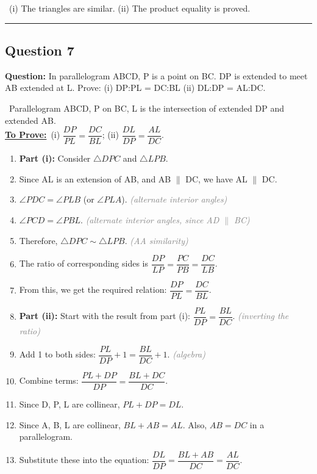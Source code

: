 \documentclass{article}
\newenvironment{steps}{%
  \begin{enumerate}[label=\textcolor{primary}{Step~\arabic*:}, leftmargin=*]
}{\end{enumerate}}
\newcommand{\sul}[1]{\uline{#1}}
\newcommand{\dul}[1]{\uuline{#1}}
\newcommand{\solutionheading}{{\raggedright\dul{\textbf{Solution}}\par}}
\newcommand{\given}[1]{\noindent\textbf{\textcolor{secondary}{\dul{Given:}}}~#1\\}
\newcommand{\toprove}[1]{\noindent\textbf{\textcolor{primary}{\sul{To Prove:}}}~#1\\}
\newcommand{\reason}[1]{\hfill\textit{\textcolor{gray}{(#1)}}}
\newcommand{\solutionrule}{\par\noindent\color{accent}\rule{\linewidth}{0.6pt}\par\smallskip}
\newcommand{\finalanswer}[1]{\noindent\textbf{\textcolor{accent}{\dul{Answer:}}}~#1\solutionrule}
\begin{document}
\finalanswer{(i) The triangles are similar. (ii) The product equality is proved.}

\subsection*{Question 7}
\textbf{Question:} In parallelogram ABCD, P is a point on BC. DP is extended to meet AB extended at L. Prove: (i) DP:PL = DC:BL (ii) DL:DP = AL:DC.

\solutionheading
\given{Parallelogram ABCD, P on BC, L is the intersection of extended DP and extended AB.}
\toprove{(i) $\dfrac{DP}{PL} = \dfrac{DC}{BL}$; (ii) $\dfrac{DL}{DP} = \dfrac{AL}{DC}$.}

\begin{center}
\end{center}

\begin{steps}
  \item \textbf{Part (i):} Consider $\triangle DPC$ and $\triangle LPB$.
  \item Since AL is an extension of AB, and AB $\parallel$ DC, we have AL $\parallel$ DC.
  \item $\angle PDC = \angle PLB$ (or $\angle PL A$). \reason{alternate interior angles}
  \item $\angle PCD = \angle PBL$. \reason{alternate interior angles, since AD $\parallel$ BC}
  \item Therefore, $\triangle DPC \sim \triangle LPB$. \reason{AA similarity}
  \item The ratio of corresponding sides is $\dfrac{DP}{LP} = \dfrac{PC}{PB} = \dfrac{DC}{LB}$.
  \item From this, we get the required relation: $\dfrac{DP}{PL} = \dfrac{DC}{BL}$.
  \item \textbf{Part (ii):} Start with the result from part (i): $\dfrac{PL}{DP} = \dfrac{BL}{DC}$. \reason{inverting the ratio}
  \item Add 1 to both sides: $\dfrac{PL}{DP} + 1 = \dfrac{BL}{DC} + 1$. \reason{algebra}
  \item Combine terms: $\dfrac{PL+DP}{DP} = \dfrac{BL+DC}{DC}$.
  \item Since D, P, L are collinear, $PL+DP=DL$.
  \item Since A, B, L are collinear, $BL+AB=AL$. Also, $AB=DC$ in a parallelogram.
  \item Substitute these into the equation: $\dfrac{DL}{DP} = \dfrac{BL+AB}{DC} = \dfrac{AL}{DC}$.
\end{steps}
\end{document}
